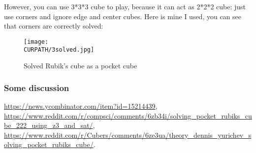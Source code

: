 However, you can use 3*3*3 cube to play, because it can act as 2*2*2 cube: just use corners and ignore
edge and center cubes.
Here is mine I used, you can see that corners are correctly solved:

\begin{figure}[H]
\centering
\texttt{[image: \\CURPATH/3solved.jpg]}
\caption{Solved Rubik's cube as a pocket cube}
\end{figure}

\subsubsection{Some discussion}

\url{https://news.ycombinator.com/item?id=15214439},\\
\url{https://www.reddit.com/r/compsci/comments/6zb34i/solving_pocket_rubiks_cube_222_using_z3_and_sat/},\\
\url{https://www.reddit.com/r/Cubers/comments/6ze3ua/theory_dennis_yurichev_solving_pocket_rubiks_cube/}.

